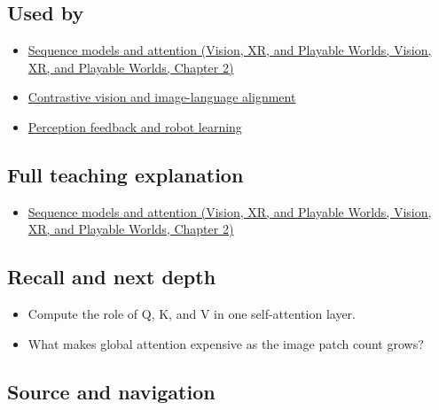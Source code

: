 \subsection{Used by}\label{appendix-a9d5dfdd164a-used-by}

\begin{itemize}
\tightlist
\item
  \href{../07-Vision-XR-and-Playable-Worlds/main.pdf\#nameddest=04-visual-computing-ii-ch031-sequence-models-and-attention}{Sequence models and attention (Vision, XR, and Playable Worlds, Vision, XR, and Playable Worlds, Chapter 2)}
\item
  \hyperref[appendix-772f1fd96148]{Contrastive vision and image-language alignment}
\item
  \hyperref[appendix-b0c42da325f1]{Perception feedback and robot learning}
\end{itemize}

\subsection{Full teaching explanation}\label{appendix-a9d5dfdd164a-full-teaching-explanation}

\begin{itemize}
\tightlist
\item
  \href{../07-Vision-XR-and-Playable-Worlds/main.pdf\#nameddest=04-visual-computing-ii-ch031-sequence-models-and-attention}{Sequence models and attention (Vision, XR, and Playable Worlds, Vision, XR, and Playable Worlds, Chapter 2)}
\end{itemize}

\subsection{Recall and next depth}\label{appendix-a9d5dfdd164a-recall-and-next-depth}

\begin{itemize}
\tightlist
\item
  Compute the role of Q, K, and V in one self-attention layer.
\item
  What makes global attention expensive as the image patch count grows?
\end{itemize}

\subsection{Source and navigation}\label{appendix-a9d5dfdd164a-source-and-navigation}


